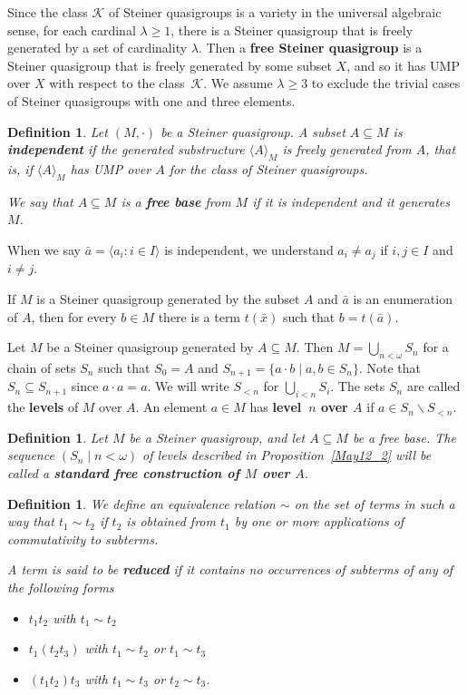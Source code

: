 \documentclass[10pt,a4paper]{article}
\theoremstyle{note}
\newtheorem{df}[thm]{Definition}
\begin{document}
Since the class $\mathcal{K}$ of Steiner quasigroups is a variety in the universal algebraic sense, for each cardinal $\lambda \geq 1$, there is a Steiner quasigroup that is freely generated by a set of cardinality $\lambda$. Then a \textbf{free Steiner quasigroup} is a Steiner quasigroup that is freely generated by some subset $X$, and so it has UMP over $X$ with respect to the class~$\mathcal{K}$. We assume $\lambda \geq 3$ to exclude the trivial cases of Steiner quasigroups with one and three elements.

	\begin{df} Let $(M,\cdot)$ be a Steiner quasigroup. A subset $A\subseteq M$ is  \textbf{independent} if the generated substructure $\langle A\rangle_M$ is freely generated from $A$, that is, if $\langle A\rangle_M$ has UMP over $A$ for the class of Steiner quasigroups. 
		
		We say that $A\subseteq M$ is a \textbf{free base} from $M$  if it is independent and it generates $M$. 
	\end{df}
	When we say $\bar{a} = \langle a_i : i \in I \rangle$ is independent, we understand $a_i\neq a_j$ if  $i,j\in I$ and $i\neq j$.
	
	If $M$ is a Steiner quasigroup generated by the subset $A$ and $\bar{a}$ is an enumeration of $A$, then for every $b \in M$ there is a term $t(\bar{x})$ such that $b=t(\bar{a})$.

 Let $M$ be a Steiner quasigroup generated by $A\subseteq M$.  Then  $M=\bigcup_{n<\omega} S_n$ for a chain of sets $S_n$ such that  $S_0 =A$ and $S_{n+1}= \{a\cdot b\mid a,b\in S_n\}$. Note that $S_n\subseteq S_{n+1}$  since  $a\cdot a = a$.
 We will write $S_{<n}$ for $\bigcup_{i<n} S_i$. 
	 The sets $S_n$  are called the \textbf{levels} of $M$ over $A$. An element $a\in M$ has   \textbf{level~$n$ over $A$}  if $a\in S_n\smallsetminus S_{<n}$.

		\begin{df} Let $M$ be a Steiner quasigroup, and let  $A\subseteq M$ be a free base. The sequence $(S_n\mid n<\omega)$ of levels described in Proposition~\ref{May12_2} will be called a \textbf{standard free construction of $M$ over $A$}.
	\end{df}

	\begin{df} We define an equivalence relation $\sim$ on the set of terms in such a way that $t_1 \sim t_2$ if $t_2$ is obtained from $t_1$ by one or more applications of commutativity to subterms.
		
		A term is said to be \textbf{reduced} if it contains no occurrences of subterms of any of the following forms
		\begin{itemize} 
			\item $t_1 t_2$ with $t_1 \sim t_2$
			\item  $t_1(t_2t_3)$ with $t_1 \sim t_2$ or $t_1 \sim t_3$
			\item $(t_1t_2)t_3$ with $t_1 \sim t_3$ or $t_2 \sim t_3$.
		\end{itemize}
	\end{df}
	
\end{document}
